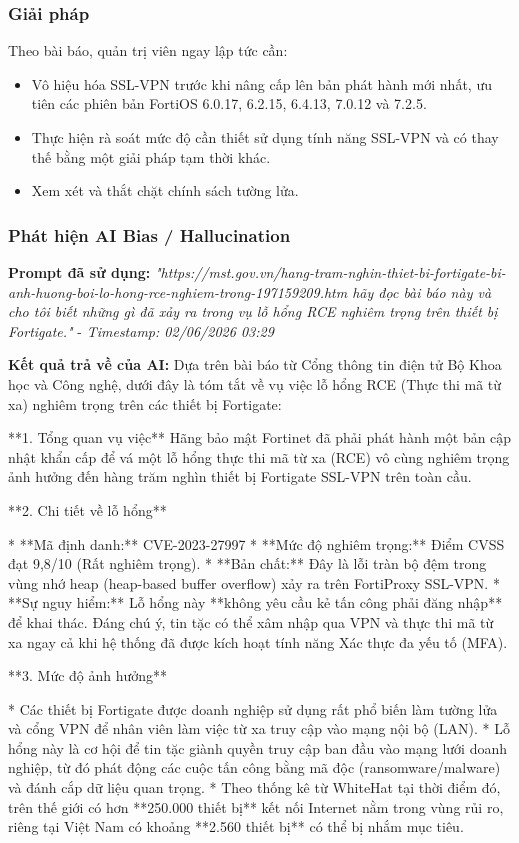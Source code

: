 \subsubsection{Giải pháp}
Theo bài báo, quản trị viên ngay lập tức cần:

\begin{itemize}
    \item Vô hiệu hóa SSL-VPN trước khi nâng cấp lên bản phát hành mới nhất, ưu tiên các phiên bản FortiOS 6.0.17, 6.2.15, 6.4.13, 7.0.12 và 7.2.5.
    \item Thực hiện rà soát mức độ cần thiết sử dụng tính năng SSL-VPN và có thay thế bằng một giải pháp tạm thời khác.
    \item Xem xét và thắt chặt chính sách tường lửa.
\end{itemize}

\subsubsection{Phát hiện AI Bias / Hallucination}
\textbf{Prompt đã sử dụng:} \textit{"{https://mst.gov.vn/hang-tram-nghin-thiet-bi-fortigate-bi-anh-huong-boi-lo-hong-rce-nghiem-trong-197159209.htm} hãy đọc bài báo này và cho tôi biết những gì đã xảy ra trong vụ lỗ hổng RCE nghiêm trọng trên thiết bị Fortigate."} - \textit{Timestamp: 02/06/2026 03:29}

\textbf{Kết quả trả về của AI:}
Dựa trên bài báo từ Cổng thông tin điện tử Bộ Khoa học và Công nghệ, dưới đây là tóm tắt về vụ việc lỗ hổng RCE (Thực thi mã từ xa) nghiêm trọng trên các thiết bị Fortigate:

**1. Tổng quan vụ việc**
Hãng bảo mật Fortinet đã phải phát hành một bản cập nhật khẩn cấp để vá một lỗ hổng thực thi mã từ xa (RCE) vô cùng nghiêm trọng ảnh hưởng đến hàng trăm nghìn thiết bị Fortigate SSL-VPN trên toàn cầu.

**2. Chi tiết về lỗ hổng**

* **Mã định danh:** CVE-2023-27997
* **Mức độ nghiêm trọng:** Điểm CVSS đạt 9,8/10 (Rất nghiêm trọng).
* **Bản chất:** Đây là lỗi tràn bộ đệm trong vùng nhớ heap (heap-based buffer overflow) xảy ra trên FortiProxy SSL-VPN.
* **Sự nguy hiểm:** Lỗ hổng này **không yêu cầu kẻ tấn công phải đăng nhập** để khai thác. Đáng chú ý, tin tặc có thể xâm nhập qua VPN và thực thi mã từ xa ngay cả khi hệ thống đã được kích hoạt tính năng Xác thực đa yếu tố (MFA).

**3. Mức độ ảnh hưởng**

* Các thiết bị Fortigate được doanh nghiệp sử dụng rất phổ biến làm tường lửa và cổng VPN để nhân viên làm việc từ xa truy cập vào mạng nội bộ (LAN).
* Lỗ hổng này là cơ hội để tin tặc giành quyền truy cập ban đầu vào mạng lưới doanh nghiệp, từ đó phát động các cuộc tấn công bằng mã độc (ransomware/malware) và đánh cắp dữ liệu quan trọng.
* Theo thống kê từ WhiteHat tại thời điểm đó, trên thế giới có hơn **250.000 thiết bị** kết nối Internet nằm trong vùng rủi ro, riêng tại Việt Nam có khoảng **2.560 thiết bị** có thể bị nhắm mục tiêu.

